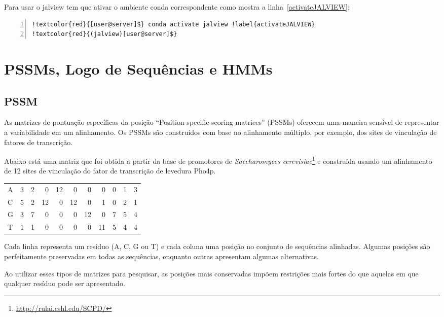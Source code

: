 \documentclass[letter,11pt]{book}
\begin{document}
Para usar o jalview tem que ativar o ambiente conda correspondente como mostra a linha~\ref{activateJALVIEW}:

\begin{Verbatim}[commandchars=!\{\},numbers=left,label=ativando ambiente jalview,frame=topline,fontsize=\scriptsize]
!textcolor{red}{[user@server]$} conda activate jalview !label{activateJALVIEW}
!textcolor{red}{(jalview)[user@server]$}
\end{Verbatim}


\chapter{PSSMs, Logo de Sequências e HMMs}

\section{PSSM}

As matrizes de pontuação específicas da posição ``Position-specific scoring matrices'' (PSSMs) oferecem uma maneira sensível de representar a variabilidade em um alinhamento. Os PSSMs são construídos com base no alinhamento múltiplo, por exemplo, dos sites de vinculação de fatores de transcrição.

Abaixo está uma matriz que foi obtida a partir da base de promotores de \textit{Saccharomyces cerevisiae}\footnote{\url{http://rulai.cshl.edu/SCPD/}} e construída usando um alinhamento de 12 sites de vinculação do fator de transcrição de levedura Pho4p.

\vskip5pt
\begin{center}
\begin{tabular}{l|r r r r r r r r r r }
A &  3 &  2 &  0 & 12 &  0 &  0 &  0 &  0 &  1 &  3\\
C &  5 &  2 & 12 &  0 & 12 &  0 &  1 &  0 &  2 &  1\\
G &  3 &  7 &  0 &  0 &  0 & 12 &  0 &  7 &  5 &  4\\
T &  1 &  1 &  0 &  0 &  0 &  0 & 11 &  5 &  4 &  4\\
\end{tabular}
\end{center}

Cada linha representa um resíduo (A, C, G ou T) e cada coluna uma posição no conjunto de sequências alinhadas. Algumas posições são perfeitamente preservadas em todas as sequências, enquanto outras apresentam algumas alternativas.


Ao utilizar esses tipos de matrizes para pesquisar, as posições mais conservadas impõem restrições mais fortes do que aquelas em que qualquer resíduo pode ser apresentado.
\end{document}
